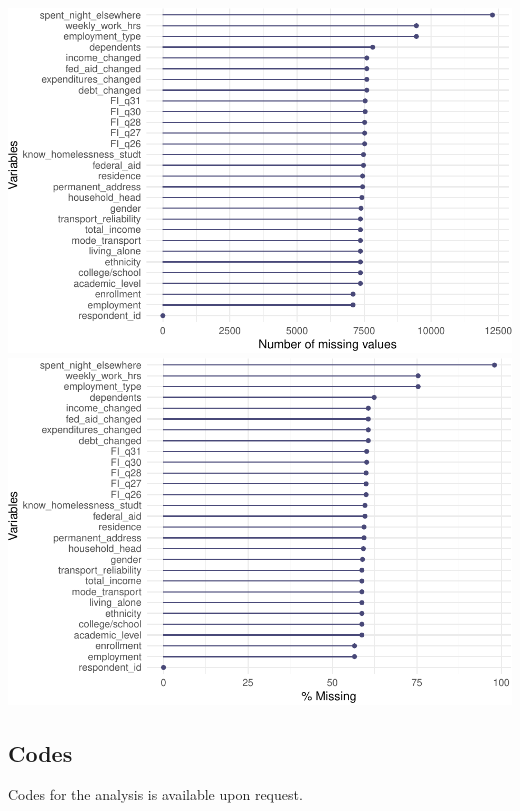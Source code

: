 \documentclass[
  10pt,
]{article}
\begin{document}
\includegraphics{phase1_report_files/figure-latex/unnamed-chunk-14-2}
\includegraphics{phase1_report_files/figure-latex/unnamed-chunk-14-3}

\hypertarget{codes}{%
\subsection{Codes}\label{codes}}

Codes for the analysis is available upon request.
\end{document}
